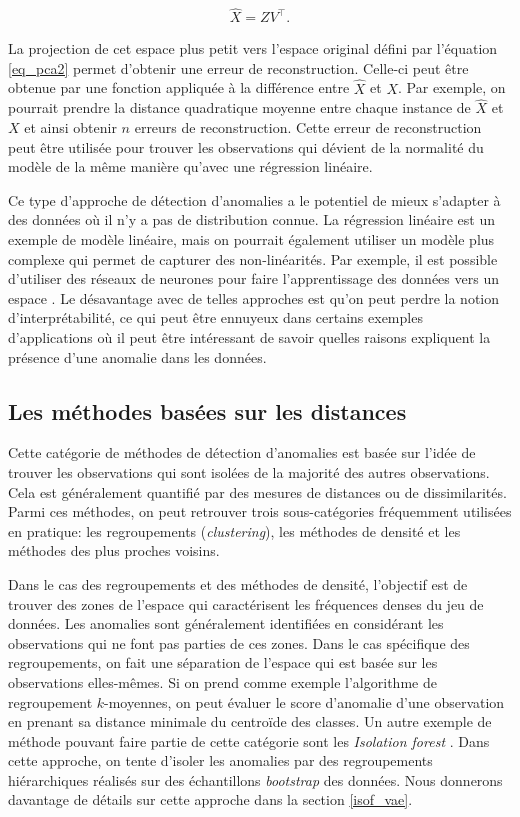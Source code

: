   \begin{gather}  \label{eq_pca2}
 \hat{X} = ZV^\top.
 \end{gather}

La projection de cet espace plus petit vers l'espace original défini par l'équation \ref{eq_pca2} permet d'obtenir une erreur de reconstruction. Celle-ci \DIFdelbegin {}\DIFdelend peut être obtenue par une fonction appliquée à la différence entre $\hat{X}$ et $X$. Par exemple, on pourrait prendre la distance quadratique moyenne entre chaque instance de $\hat{X}$ et $X$ et ainsi obtenir $n$ erreurs de reconstruction. Cette erreur de reconstruction peut être utilisée pour trouver les observations qui dévient de la normalité du modèle de la même manière qu'avec une régression linéaire.

Ce type d'approche de détection d'anomalies a le potentiel de mieux s'adapter à des données où il n'y a pas de distribution connue. La régression linéaire est un exemple de modèle linéaire, mais on pourrait également utiliser un modèle plus complexe qui permet de capturer des non-linéarités. Par exemple, il est possible d'utiliser des réseaux de neurones pour faire l'apprentissage des données vers un espace \DIFdelbegin {}\DIFdelend \DIFaddbegin {}\DIFaddend . Le désavantage avec de telles approches est qu'on peut perdre la notion d'interprétabilité, ce qui peut être ennuyeux dans certains exemples d'applications où il peut être intéressant de savoir quelles raisons expliquent la présence d'une anomalie dans les données.

\subsection{Les méthodes basées sur les distances}

Cette catégorie de méthodes de détection d'anomalies est basée sur l'idée de trouver les observations qui sont isolées de la majorité des autres observations. Cela est généralement quantifié par des mesures de distances ou de dissimilarités. Parmi ces méthodes, on peut retrouver trois	 sous-catégories fréquemment utilisées en pratique: les regroupements (\textit{clustering}), les méthodes de densité et les méthodes des plus proches voisins.

Dans le cas des regroupements et des méthodes de densité, l'objectif est de trouver des zones de l'espace qui caractérisent les fréquences denses du jeu de données. Les anomalies sont généralement identifiées en considérant les observations qui ne font pas parties de ces zones. Dans le cas spécifique des regroupements, on fait une séparation de l'espace qui est basée sur les observations elles-mêmes. Si on prend comme exemple l'algorithme de regroupement $k$-moyennes, on peut évaluer le score d'anomalie d'une observation en prenant sa distance minimale du centroïde des classes. Un autre exemple de méthode pouvant faire partie de cette catégorie sont les \textit{Isolation forest} \citep{4781136}. Dans cette approche, on tente d'isoler les anomalies par des regroupements hiérarchiques réalisés sur des échantillons \textit{bootstrap} des données. Nous donnerons davantage de détails sur cette approche dans la section \ref{isof_vae}.


